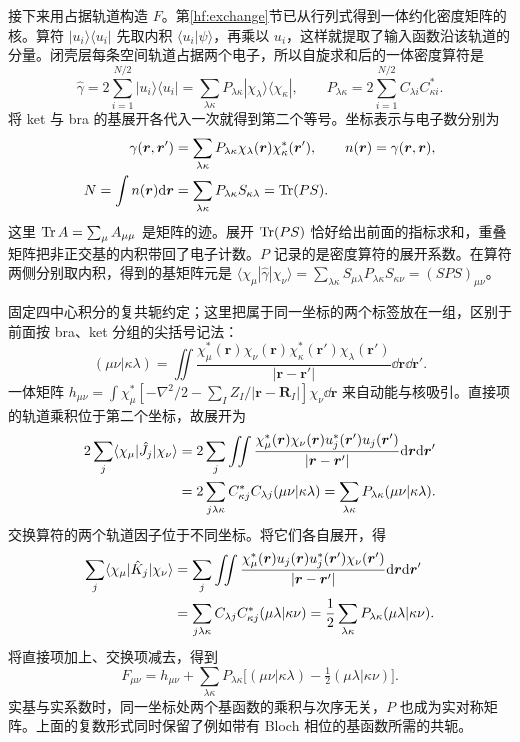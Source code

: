 接下来用占据轨道构造 $F$。第\ref{hf:exchange}节已从行列式得到一体约化密度矩阵的核。算符 $|u_i\rangle\langle u_i|$ 先取内积 $\langle u_i|\psi\rangle$，再乘以 $u_i$，这样就提取了输入函数沿该轨道的分量。闭壳层每条空间轨道占据两个电子，所以自旋求和后的一体密度算符是
\begin{equation}
\hat\gamma=2\sum_{i=1}^{N/2}|u_i\rangle\langle u_i|
=\sum_{\lambda\kappa}P_{\lambda\kappa}|\chi_\lambda\rangle\langle\chi_\kappa|,
\qquad P_{\lambda\kappa}=2\sum_{i=1}^{N/2}C_{\lambda i}C_{\kappa i}^*.
\end{equation}
将 ket 与 bra 的基展开各代入一次就得到第二个等号。坐标表示与电子数分别为
\begin{align}
\gamma(\bm r,\bm r')&=\sum_{\lambda\kappa}P_{\lambda\kappa}
\chi_\lambda(\bm r)\chi_\kappa^*(\bm r'),
\qquad n(\bm r)=\gamma(\bm r,\bm r),\\
N=\int n(\bm r)\mathrm{d}\bm r
&=\sum_{\lambda\kappa}P_{\lambda\kappa}S_{\kappa\lambda}
=\operatorname{Tr}(PS).
\end{align}
这里 $\operatorname{Tr} A=\sum_\mu A_{\mu\mu}$ 是矩阵的迹。展开 $\operatorname{Tr}(PS)$ 恰好给出前面的指标求和，重叠矩阵把非正交基的内积带回了电子计数。$P$ 记录的是密度算符的展开系数。在算符两侧分别取内积，得到的基矩阵元是 $\langle\chi_\mu|\hat\gamma|\chi_\nu\rangle=\sum_{\lambda\kappa}S_{\mu\lambda}P_{\lambda\kappa}S_{\kappa\nu}=(SPS)_{\mu\nu}$。

固定四中心积分的复共轭约定；这里把属于同一坐标的两个标签放在一组，区别于前面按 bra、ket 分组的尖括号记法：
\begin{equation}
(\mu\nu|\kappa\lambda)=\iint\frac{\chi_\mu^*(\bm r)\chi_\nu(\bm r)\chi_\kappa^*(\bm r')\chi_\lambda(\bm r')}{|\bm r-\bm r'|}\dd\bm r\dd\bm r'.
\end{equation}
一体矩阵 $h_{\mu\nu}=\int\chi_\mu^*[-\nabla^2/2-\sum_I Z_I/|\bm r-\bm R_I|]\chi_\nu\dd\bm r$ 来自动能与核吸引。直接项的轨道乘积位于第二个坐标，故展开为
\begin{align}
2\sum_j\langle\chi_\mu|\hat J_j|\chi_\nu\rangle
&=2\sum_j\iint\frac{\chi_\mu^*(\bm r)\chi_\nu(\bm r)
u_j^*(\bm r')u_j(\bm r')}{|\bm r-\bm r'|}\mathrm{d}\bm r\mathrm{d}\bm r'\notag\\
&=2\sum_{j\lambda\kappa}C_{\kappa j}^*C_{\lambda j}(\mu\nu|\kappa\lambda)
=\sum_{\lambda\kappa}P_{\lambda\kappa}(\mu\nu|\kappa\lambda).
\end{align}
交换算符的两个轨道因子位于不同坐标。将它们各自展开，得
\begin{align}
\sum_j\langle\chi_\mu|\hat K_j|\chi_\nu\rangle
&=\sum_j\iint\frac{\chi_\mu^*(\bm r)u_j(\bm r)
u_j^*(\bm r')\chi_\nu(\bm r')}{|\bm r-\bm r'|}\mathrm{d}\bm r\mathrm{d}\bm r'\notag\\
&=\sum_{j\lambda\kappa}C_{\lambda j}C_{\kappa j}^*(\mu\lambda|\kappa\nu)
=\frac12\sum_{\lambda\kappa}P_{\lambda\kappa}(\mu\lambda|\kappa\nu).
\end{align}
将直接项加上、交换项减去，得到
\begin{equation}
F_{\mu\nu}=h_{\mu\nu}+\sum_{\lambda\kappa}P_{\lambda\kappa}
\bigl[(\mu\nu|\kappa\lambda)-\tfrac12(\mu\lambda|\kappa\nu)\bigr].
\end{equation}
实基与实系数时，同一坐标处两个基函数的乘积与次序无关，$P$ 也成为实对称矩阵。上面的复数形式同时保留了例如带有 Bloch 相位的基函数所需的共轭。


